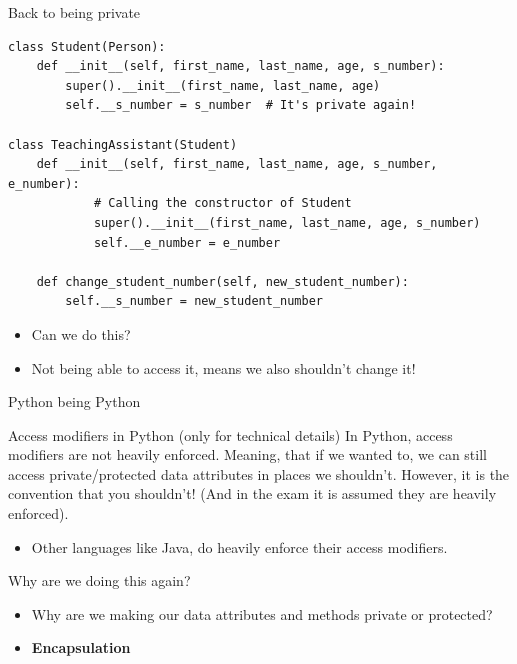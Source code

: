 \begin{frame}[fragile]{Back to being private}
\begin{verbatim}
class Student(Person):
    def __init__(self, first_name, last_name, age, s_number):
        super().__init__(first_name, last_name, age)
        self.__s_number = s_number  # It's private again!

class TeachingAssistant(Student)
    def __init__(self, first_name, last_name, age, s_number, e_number):
            # Calling the constructor of Student
            super().__init__(first_name, last_name, age, s_number)
            self.__e_number = e_number

    def change_student_number(self, new_student_number):
        self.__s_number = new_student_number
\end{verbatim}
\begin{itemize}
    \item Can we do this?
    \pause
    \item Not being able to access it, means we also shouldn't change it!
\end{itemize}
\end{frame}

\begin{frame}{Python being Python}
    \pause
    \begin{alertblock}{Access modifiers in Python (only for technical details)}
        In Python, access modifiers are not heavily enforced. Meaning, that if we wanted to, we can still access private/protected data attributes in places we shouldn't. However, it is the convention that you shouldn't! (And in the exam it is assumed they are heavily enforced).
    \end{alertblock}
    \begin{itemize}
        \item Other languages like Java, do heavily enforce their access modifiers.
    \end{itemize}
\end{frame}

\begin{frame}{Why are we doing this again?}
\begin{itemize}
    \item Why are we making our data attributes and methods private or protected?
    \pause
    \item \textbf{Encapsulation}
\end{itemize}
\end{frame}